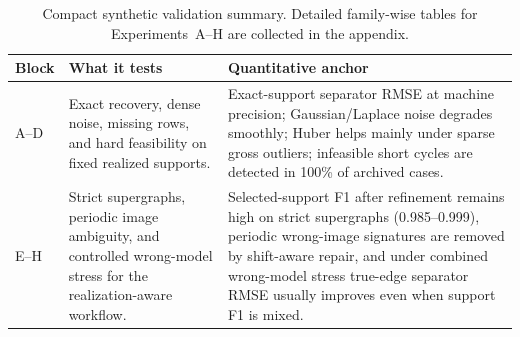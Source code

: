 \begin{table}[t]
\caption{Compact synthetic validation summary. Detailed family-wise tables for
Experiments~A--H are collected in the appendix.}
\label{tab:synthetic_summary}
\centering
\footnotesize
\setlength{\tabcolsep}{5pt}
\renewcommand{\arraystretch}{1.12}
\begin{tabular}{>{\raggedright\arraybackslash}p{}>{\raggedright\arraybackslash}p{}>{\raggedright\arraybackslash}p{}}
\toprule
Block & What it tests & Quantitative anchor \\
\midrule
A--D & Exact recovery, dense noise, missing rows, and hard feasibility on fixed realized supports. & Exact-support separator RMSE at machine precision; Gaussian/Laplace noise degrades smoothly; Huber helps mainly under sparse gross outliers; infeasible short cycles are detected in 100\% of archived cases. \\
E--H & Strict supergraphs, periodic image ambiguity, and controlled wrong-model stress for the realization-aware workflow. & Selected-support F1 after refinement remains high on strict supergraphs (0.985--0.999), periodic wrong-image signatures are removed by shift-aware repair, and under combined wrong-model stress true-edge separator RMSE usually improves even when support F1 is mixed. \\
\bottomrule
\end{tabular}
\end{table}
